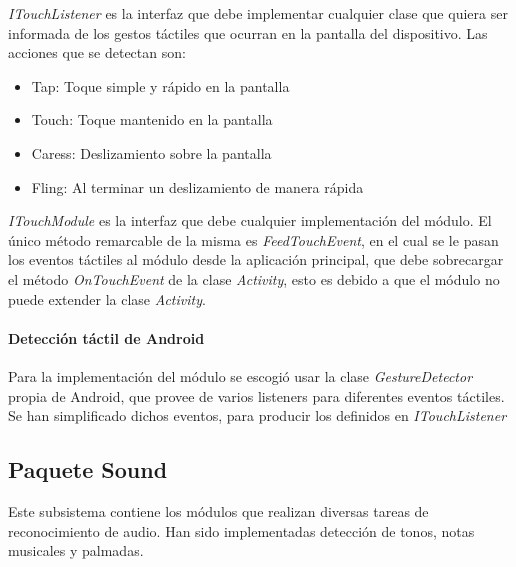 \textit{ITouchListener} es la interfaz que debe implementar cualquier clase que quiera ser informada de los gestos táctiles que ocurran en la pantalla del dispositivo. Las acciones que se detectan son:

\begin{itemize}
	\item  Tap: Toque simple y rápido en la pantalla
	\item  Touch: Toque mantenido en la pantalla
	\item  Caress: Deslizamiento sobre la pantalla
	\item  Fling: Al terminar un deslizamiento de manera rápida
\end{itemize}


\textit{ITouchModule} es la interfaz que debe cualquier implementación del módulo. El único método remarcable de la misma es \textit{FeedTouchEvent}, en el cual se le pasan los eventos táctiles al módulo desde la aplicación principal, que debe sobrecargar el método \textit{OnTouchEvent} de la clase \textit{Activity}, esto es debido a que el módulo no puede extender la clase \textit{Activity}.

\paragraph*{Detección táctil de Android\\}


Para la implementación del módulo se escogió usar la clase \textit{GestureDetector} propia de Android, que provee de varios listeners para diferentes eventos táctiles.
Se han simplificado dichos eventos, para producir los definidos en \textit{ITouchListener}


\newpage

\subsection{Paquete Sound}
Este subsistema contiene los módulos que realizan diversas tareas de reconocimiento de audio.  Han sido implementadas detección de tonos, notas musicales y palmadas.

